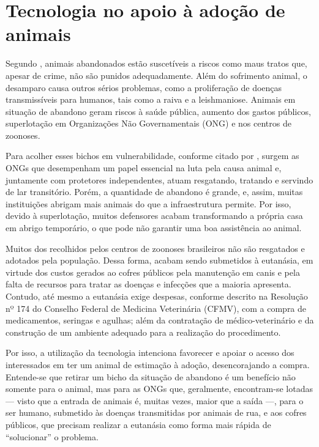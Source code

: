 \documentclass[portuguese]{textolivre}
\begin{document}
\label{sec:conceitosSistemaRecomendacao}



\section{Tecnologia no apoio à adoção de animais} 
\label{cap:tecadocao}

Segundo \textcite{Gomes}, animais abandonados estão suscetíveis a riscos como maus tratos que, apesar de crime, não são punidos adequadamente. Além do sofrimento animal, o desamparo causa outros sérios problemas, como a proliferação de doenças transmissíveis para humanos, tais como a raiva e a leishmaniose. Animais em situação de abandono geram riscos à saúde pública, aumento dos gastos públicos, superlotação em Organizações Não Governamentais (ONG) e nos centros de zoonoses.

Para acolher esses bichos em vulnerabilidade, conforme citado por \textcite{Matos}, surgem as ONGs que desempenham um papel essencial na luta pela causa animal e, juntamente com protetores independentes, atuam resgatando, tratando e servindo de lar transitório. Porém, a quantidade de abandono é grande, e, assim, muitas instituições abrigam mais animais do que a infraestrutura permite. Por isso, devido à superlotação, muitos defensores acabam transformando a própria casa em abrigo temporário, o que pode não garantir uma boa assistência ao animal. 

Muitos dos recolhidos pelos centros de zoonoses brasileiros não são resgatados e adotados pela população. Dessa forma, acabam sendo submetidos à eutanásia, em virtude dos custos gerados ao cofres públicos pela manutenção em canis \cite{GARCIA-RODRIGUEZ2008} e pela falta de recursos para tratar as doenças e infecções que a maioria apresenta. Contudo, até mesmo a eutanásia exige despesas, conforme descrito na Resolução nº 174 do Conselho Federal de Medicina Veterinária (CFMV), com a compra de medicamentos, seringas e agulhas; além da contratação de médico-veterinário e da construção de um ambiente adequado para a realização do procedimento.

Por isso,  a utilização da tecnologia intenciona favorecer e apoiar o acesso dos interessados em ter um animal de estimação à adoção, desencorajando a compra. Entende-se que retirar um bicho da situação de abandono é um benefício não somente para o animal, mas para as ONGs que, geralmente, encontram-se lotadas — visto que a entrada de animais é, muitas vezes, maior que a saída —, para o ser humano, submetido às doenças transmitidas por animais de rua, e aos cofres públicos, que precisam realizar a eutanásia como forma mais rápida de “solucionar” o problema.
\end{document}
